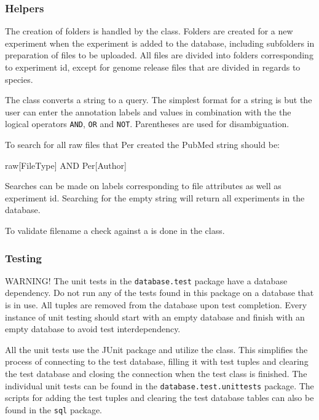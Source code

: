 \subsubsection{Helpers}
The creation of folders is handled by the  class. Folders are created for a new experiment when the experiment is added to the database, including subfolders in preparation of files to be uploaded. All files are divided into folders corresponding to experiment id, except for genome release files that are divided in regards to species.

The  class converts a  string to a  query. The simplest format for a  string is  but the user can enter the annotation labels and values in combination with the the logical operators \texttt{AND}, \texttt{OR} and \texttt{NOT}. Parentheses are used for disambiguation.
\begin{example}
To search for all raw files that Per created the PubMed string should be:

raw[FileType] AND Per[Author]
\end{example}

Searches can be made on labels corresponding to file attributes as well as experiment id. Searching for the empty string will return all experiments in the database.

To validate filename a check against a  is done in the  class.

\subsubsection{Testing}
WARNING! The unit tests in the \texttt{database.test} package have a database dependency. Do not run any of the tests found in this package on a database that is in use. All tuples are removed from the database upon test completion. Every instance of unit testing should start with an empty database and finish with an empty database to avoid test interdependency.

All the unit tests use the JUnit package and utilize the  class. This simplifies the process of connecting to the test database, filling it with test tuples and clearing the test database and closing the connection when the test class is finished. The individual unit tests can be found in the \texttt{database.test.unittests} package. The scripts for adding the test tuples and clearing the test database tables can also be found in the \texttt{sql} package.